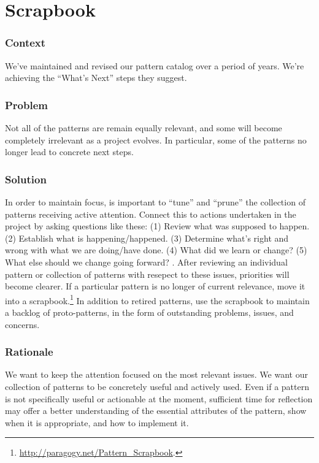 \section{Scrapbook} \label{sec:Scrapbook}

\subsubsection*{Context} We've maintained and revised our pattern catalog over a period of years.  We're achieving
the ``What's Next'' steps they suggest.

\subsubsection*{Problem} Not all of the patterns are remain equally relevant, and some will become completely irrelevant as a project evolves.  In particular, some of the patterns no longer lead to concrete next steps.

\subsubsection*{Solution} In order to maintain focus, is important to ``tune'' and ``prune'' the collection of patterns receiving active attention.  Connect this to actions undertaken in the project by asking questions like these:
(1) Review what was supposed to happen.
(2) Establish what is happening/happened.
(3) Determine what’s right and wrong with what we are doing/have done.
(4) What did we learn or change? 
(5) What else should we change going forward?  \cite[Chapter 28]{peeragogy-handbook}.
%
After reviewing an individual pattern or collection of patterns with
resepect to these issues, priorities will become clearer.  If a
particular pattern is no longer of current relevance, move it into a
scrapbook.\footnote{\url{http://paragogy.net/Pattern_Scrapbook}.}  In
addition to retired patterns, use the scrapbook to maintain a
backlog of proto-patterns, in the form of outstanding problems, issues,
and concerns.

\subsubsection*{Rationale} We want to keep the attention focused on the most relevant issues.
We want our collection of patterns to be concretely useful and actively used.
Even if a pattern is not specifically useful or actionable at the
moment, sufficient time for reflection may offer a better
understanding of the essential attributes of the pattern, show when it
is appropriate, and how to implement it.


